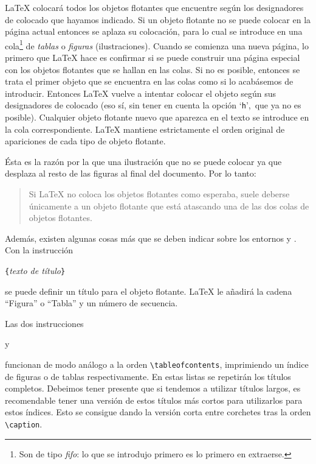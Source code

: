 \LaTeX{} colocará todos los objetos  flotantes que encuentre según los
de\-sig\-na\-do\-res de  colocado que  hayamos indicado. Si  un objeto
flotante no se puede colocar en la página actual entonces se aplaza su
colocación, para lo cual se introduce en una cola\footnote{Son de tipo
\emph{fifo}: lo que se introdujo  primero es lo primero en extraerse.}
de \emph{tablas} o \emph{figuras}  (ilustraciones). Cuando se comienza
una nueva  página, lo  primero que  \LaTeX{} hace  es confirmar  si se
puede construir una  página especial con los objetos  flotantes que se
hallan en  las colas. Si  no es posible,  entonces se trata  el primer
objeto  que  se encuentra  en  las  colas  como  si lo  acabásemos  de
introducir.  Entonces \LaTeX{}  vuelve  a intentar  colocar el  objeto
según  sus designadores  de  colocado  (eso sí,  sin  tener en  cuenta
la  opción  `\verb|h|',\  que  ya no  es  posible).  Cualquier  objeto
flotante  nuevo que  aparezca  en el  texto se  introduce  en la  cola
correspondiente. \LaTeX{} mantiene estrictamente  el orden original de
apariciones de cada tipo de objeto flotante.

Ésta es la razón por la que una ilustración que no se puede colocar ya
que desplaza  al resto de las  figuras al final del  documento. Por lo
tanto:

\begin{quote}
Si  \LaTeX{} no  coloca  los objetos  flotantes  como esperaba,  suele
deberse únicamente a un objeto flotante  que está atascando una de las
dos colas de objetos flotantes.
\end{quote}


\noindent Además, existen algunas cosas más que se deben indicar sobre
los entornos  y . Con la instrucción

\begin{command}
\verb|{|\emph{texto de título}\verb|}|
\end{command}

\noindent se puede definir un título para el objeto flotante. \LaTeX{}
le añadirá la cadena ``Figura'' o ``Tabla'' y un número de secuencia.

Las dos instrucciones
\begin{command}
 y  
\end{command}

\noindent    funcionan     de    modo     análogo    a     la    orden
\verb|\tableofcontents|, imprimiendo un índice  de figuras o de tablas
respectivamente. En  estas listas se repetirán  los títulos completos.
Debeimos tener presente que si  tendemos a utilizar títulos largos, es
recomendable  tener  una versión  de  estos  títulos más  cortos  para
utilizarlos  para estos  índices. Esto  se consigue  dando la  versión
corta entre corchetes tras la orden \verb|\caption|.

